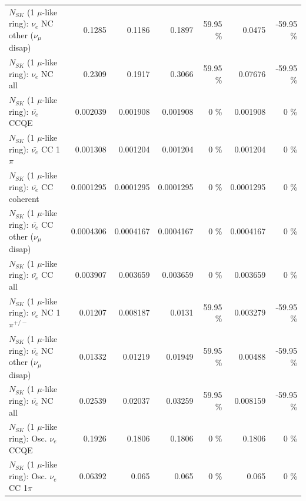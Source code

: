 \begin{table}
\begin{tabular}{| l | r | r | r  r | r  r |}
                $N_{SK}$ (1 $\mu$-like ring): $\nu_e$ NC other ($\nu_\mu$ disap) &          0.1285 &          0.1186 &          0.1897 &    59.95 \%  &          0.0475 &   -59.95 \%  \\ 
                                  $N_{SK}$ (1 $\mu$-like ring): $\nu_{e}$ NC all &          0.2309 &          0.1917 &          0.3066 &    59.95 \%  &         0.07676 &   -59.95 \%  \\ 
\hline
\hline
\hline
                                $N_{SK}$ (1 $\mu$-like ring): $\bar{\nu_e}$ CCQE &        0.002039 &        0.001908 &        0.001908 &        0 \%  &        0.001908 &        0 \%  \\ 
                           $N_{SK}$ (1 $\mu$-like ring): $\bar{\nu_e}$ CC 1$\pi$ &        0.001308 &        0.001204 &        0.001204 &        0 \%  &        0.001204 &        0 \%  \\ 
                         $N_{SK}$ (1 $\mu$-like ring): $\bar{\nu_e}$ CC coherent &       0.0001295 &       0.0001295 &       0.0001295 &        0 \%  &       0.0001295 &        0 \%  \\ 
          $N_{SK}$ (1 $\mu$-like ring): $\bar{\nu_e}$ CC other ($\nu_\mu$ disap) &       0.0004306 &       0.0004167 &       0.0004167 &        0 \%  &       0.0004167 &        0 \%  \\ 
                            $N_{SK}$ (1 $\mu$-like ring): $\bar{\nu_{e}}$ CC all &        0.003907 &        0.003659 &        0.003659 &        0 \%  &        0.003659 &        0 \%  \\ 
\hline
                     $N_{SK}$ (1 $\mu$-like ring): $\bar{\nu_e}$ NC 1$\pi^{+/-}$ &         0.01207 &        0.008187 &          0.0131 &    59.95 \%  &        0.003279 &   -59.95 \%  \\ 
          $N_{SK}$ (1 $\mu$-like ring): $\bar{\nu_e}$ NC other ($\nu_\mu$ disap) &         0.01332 &         0.01219 &         0.01949 &    59.95 \%  &         0.00488 &   -59.95 \%  \\ 
                            $N_{SK}$ (1 $\mu$-like ring): $\bar{\nu_{e}}$ NC all &         0.02539 &         0.02037 &         0.03259 &    59.95 \%  &        0.008159 &   -59.95 \%  \\ 
\hline
\hline
\hline
                                 $N_{SK}$ (1 $\mu$-like ring): Osc. $\nu_e$ CCQE &          0.1926 &          0.1806 &          0.1806 &        0 \%  &          0.1806 &        0 \%  \\ 
                            $N_{SK}$ (1 $\mu$-like ring): Osc. $\nu_e$ CC 1$\pi$ &         0.06392 &           0.065 &           0.065 &        0 \%  &           0.065 &        0 \%  \\ 

\end{tabular}
\end{table}

